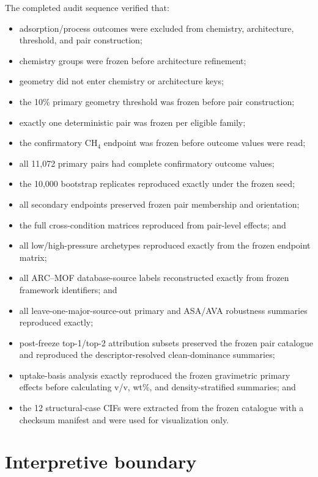 \documentclass[11pt,a4paper]{article}
\begin{document}
The completed audit sequence verified that:
\begin{itemize}
    \item adsorption/process outcomes were excluded from chemistry, architecture,
          threshold, and pair construction;
    \item chemistry groups were frozen before architecture refinement;
    \item geometry did not enter chemistry or architecture keys;
    \item the 10\% primary geometry threshold was frozen before pair construction;
    \item exactly one deterministic pair was frozen per eligible family;
    \item the confirmatory CH$_4$ endpoint was frozen before outcome values were read;
    \item all 11,072 primary pairs had complete confirmatory outcome values;
    \item the 10,000 bootstrap replicates reproduced exactly under the frozen seed;
    \item all secondary endpoints preserved frozen pair membership and orientation;
    \item the full cross-condition matrices reproduced from pair-level effects; and
    \item all low/high-pressure archetypes reproduced exactly from the frozen
          endpoint matrix;
    \item all ARC--MOF database-source labels reconstructed exactly from frozen
          framework identifiers; and
    \item all leave-one-major-source-out primary and ASA/AVA robustness summaries
          reproduced exactly;
    \item post-freeze top-1/top-2 attribution subsets preserved the frozen pair
          catalogue and reproduced the descriptor-resolved clean-dominance summaries;
    \item uptake-basis analysis exactly reproduced the frozen gravimetric primary
          effects before calculating v/v, wt\%, and density-stratified summaries; and
    \item the 12 structural-case CIFs were extracted from the frozen catalogue with
          a checksum manifest and were used for visualization only.
\end{itemize}

\section{Interpretive boundary}
\label{sec:boundary}
\end{document}
